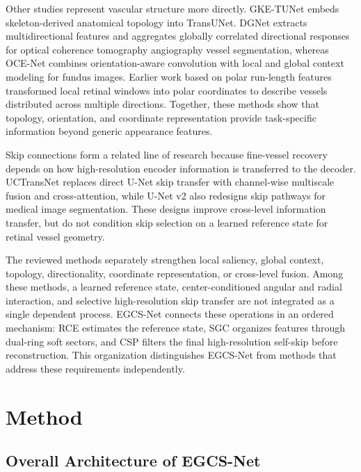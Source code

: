 \documentclass[a4paper,fleqn]{cas-sc}
\begin{document}
Other studies represent vascular structure more directly.
GKE-TUNet embeds skeleton-derived anatomical topology into TransUNet\cite{qiu2024gke}.
DGNet extracts multidirectional features and aggregates globally correlated directional responses for optical coherence tomography angiography vessel segmentation\cite{li2025direction}, whereas OCE-Net combines orientation-aware convolution with local and global context modeling for fundus images\cite{wei2023orientation}.
Earlier work based on polar run-length features transformed local retinal windows into polar coordinates to describe vessels distributed across multiple directions\cite{rezatofighi2009polar}.
Together, these methods show that topology, orientation, and coordinate representation provide task-specific information beyond generic appearance features.

Skip connections form a related line of research because fine-vessel recovery depends on how high-resolution encoder information is transferred to the decoder.
UCTransNet replaces direct U-Net skip transfer with channel-wise multiscale fusion and cross-attention, while U-Net v2 also redesigns skip pathways for medical image segmentation\cite{wang2022uctransnet,peng2025u}.
These designs improve cross-level information transfer, but do not condition skip selection on a learned reference state for retinal vessel geometry.

The reviewed methods separately strengthen local saliency, global context, topology, directionality, coordinate representation, or cross-level fusion.
Among these methods, a learned reference state, center-conditioned angular and radial interaction, and selective high-resolution skip transfer are not integrated as a single dependent process.
EGCS-Net connects these operations in an ordered mechanism: RCE estimates the reference state, SGC organizes features through dual-ring soft sectors, and CSP filters the final high-resolution self-skip before reconstruction.
This organization distinguishes EGCS-Net from methods that address these requirements independently.

\section{Method}
\label{method}

\subsection{Overall Architecture of EGCS-Net}
\end{document}
